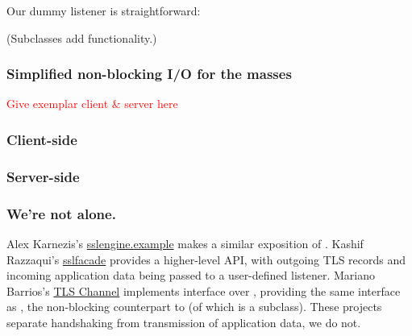 

\noindent
Our dummy listener is straightforward:



\noindent
(Subclasses add functionality.)


\lstset{widthgobble=1*1}


\subsubsection{Simplified non-blocking I/O for the masses}

\textcolor{red}{Give exemplar client \& server here}

\subsubsection*{Client-side}

\subsubsection*{Server-side}


\subsubsection*{We're not alone.}

Alex Karnezis's \href{https://github.com/alkarn/sslengine.example}{sslengine.example} makes a 
similar exposition of . 
%
Kashif Razzaqui's \href{https://github.com/kashifrazzaqui/sslfacade/}{sslfacade} provides a 
higher-level API, with outgoing TLS records and incoming application data being passed to 
a user-defined listener.
%
Mariano Barrios's \href{https://github.com/marianobarrios/tls-channel}{TLS Channel} implements
interface  over , providing the same interface as 
, the non-blocking counterpart to  (of which 
is a subclass).
%
These projects separate handshaking from transmission of application data, we do not.
